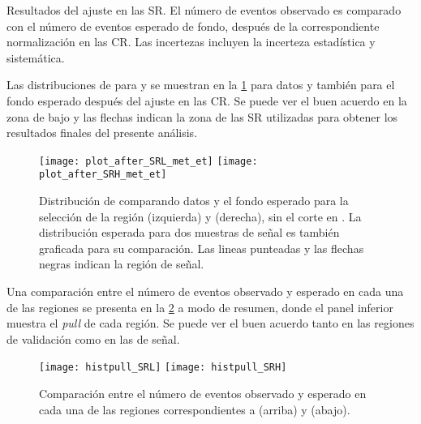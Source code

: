 \begin{table}[!htbp]
  \centering

  \caption{Resultados del ajuste en las SR. El número de eventos observado es comparado con el número de
    eventos esperado de fondo, después de la correspondiente normalización en
    las CR. Las incertezas incluyen la incerteza estadística y sistemática.}
  \label{tab:fit_result_sr}

  

\end{table}


Las distribuciones de {\met} para {\SRL} y {\SRH} se muestran en la
\cref{fig:met_sr} para datos y también para el fondo esperado después del
ajuste en las CR. Se puede ver el buen acuerdo en la zona de bajo {\met} y las
flechas indican la zona de las SR utilizadas para obtener los resultados finales
del presente análisis.

\begin{figure}[!htbp]

  \centering

  \texttt{[image: plot\_after\_SRL\_met\_et]}
  \texttt{[image: plot\_after\_SRH\_met\_et]}

  \caption{Distribución de {\met} comparando datos y el fondo esperado para la
    selección de la región {\SRL} (izquierda) y {\SRH} (derecha), sin el corte
    en {\met}. La distribución esperada para dos muestras de señal es también
    graficada para su comparación. Las lineas punteadas y las flechas negras indican
    la región de señal.}
  \label{fig:met_sr}

\end{figure}


Una comparación entre el número de eventos observado y esperado en cada una de las
regiones se presenta en la \cref{fig:fit_region_composition} a modo de resumen, donde
el panel inferior muestra el \emph{pull} de cada región. Se puede ver el buen acuerdo
tanto en las regiones de validación como en las de señal.


\begin{figure}[!htbp]
  \centering

  \texttt{[image: histpull\_SRL]}
  \texttt{[image: histpull\_SRH]}

  \caption{Comparación entre el número de eventos observado y esperado en cada
    una de las regiones correspondientes a {\SRL} (arriba) y {\SRH} (abajo).}

  \label{fig:fit_region_composition}

\end{figure}


